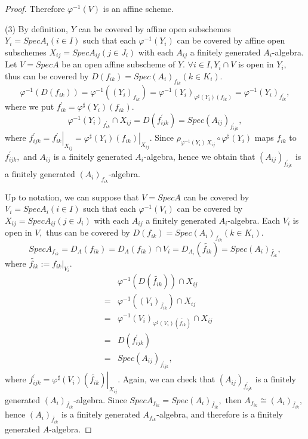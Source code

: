 \begin{proof}
Therefore $\varphi^{-1}(V)$ is an affine scheme.
\item[(3)]By definition, $Y$ can be covered by affine open subschemes $Y_i=SpecA_i(i\in I)$ such
that each $\varphi^{-1}(Y_i)$ can be covered by affine open
subschemes $X_{ij}=SpecA_{ij}(j\in J_i)$ with each $A_{ij}$ a
finitely generated $A_i$-algebra. Let $V=SpecA$ be an open affine
subscheme of $Y.$ $\forall i\in I, Y_i\cap V$ is open in $Y_i,$ thus
can be covered by $D(f_{ik})=Spec(A_i)_{f_{ik}}(k\in K_i).$
$$\varphi^{-1}(D(f_{ik}))=\varphi^{-1}((Y_i)_{f_{ik}})=
\varphi^{-1}(Y_i)_{\varphi^{\sharp}(Y_i)(f_{ik})}=
\varphi^{-1}(Y_i)_{f_{ik}^{\prime}},$$ where we put
$f_{ik}^{\prime}=\varphi^{\sharp}(Y_i)(f_{ik}).$
$$\varphi^{-1}(Y_i)_{f_{ik}^{\prime}}\cap X_{ij}=D(f_{ijk}^{\prime})=Spec(A_{ij})_{f_{ijk}^{\prime}},$$
where
$f_{ijk}^{\prime}=\left.f_{ik}^{\prime}\right|_{X_{ij}}=\left.\varphi^{\sharp}(Y_i)(f_{ik})\right|_{X_{ij}}.$
Since $\rho_{\varphi^{-1}(Y_i)\,X_{ij}}\circ\varphi^{\sharp}(Y_i)$
maps $f_{ik}$ to $f_{ijk}^{\prime},$ and $A_{ij}$ is a finitely
generated $A_i$-algebra, hence we obtain that
$(A_{ij})_{f_{ijk}^{\prime}}$ is a finitely generated
$(A_i)_{f_{ik}}$-algebra.

Up to notation, we can suppose that $V=SpecA$ can be covered by
$V_i=SpecA_i(i\in I)$ such that each $\varphi^{-1}(V_i)$ can be
covered by $X_{ij}=SpecA_{ij}(j\in J_i)$ with each $A_{ij}$ a
finitely generated $A_i$-algebra. Each $V_i$ is open in $V,$ thus
can be covered by $D(f_{ik})=Spec(A_i)_{f_{ik}}(k\in K_i).$
$$SpecA_{f_{ik}}=D_A(f_{ik})=D_A(f_{ik})\cap V_i=D_{A_i}(\widetilde{f_{ik}})=Spec(A_i)_{\widetilde{f_{ik}}},$$
where $\widetilde{f_{ik}}:=\left.f_{ik}\right|_{V_i}.$
\begin{eqnarray*}
& & \varphi^{-1}(D(\widetilde{f_{ik}}))\cap X_{ij}  \\
& = & \varphi^{-1}((V_i)_{\widetilde{f_{ik}}})\cap X_{ij} \\
& = &
\varphi^{-1}(V_i)_{\varphi^{\sharp}(V_i)(\widetilde{f_{ik}})}\cap
X_{ij}                                              \\
& = & D(f_{ijk}^{\prime})                           \\
& = & Spec(A_{ij})_{f_{ijk}^{\prime}},
\end{eqnarray*}
where
$f_{ijk}^{\prime}=\left.\varphi^{\sharp}(V_i)(\widetilde{f_{ik}})\right|_{X_{ij}}.$
Again, we can check that $(A_{ij})_{f_{ijk}^{\prime}}$ is a finitely
generated $(A_i)_{\widetilde{f_{ik}}}$-algebra. Since
$SpecA_{f_{ik}}=Spec(A_i)_{\widetilde{f_{ik}}},$ then
$A_{f_{ik}}\cong (A_i)_{\widetilde{f_{ik}}},$ hence
$(A_i)_{\widetilde{f_{ik}}}$ is a finitely generated
$A_{f_{ik}}$-algebra, and therefore is a finitely generated
$A$-algebra.


\end{proof}
